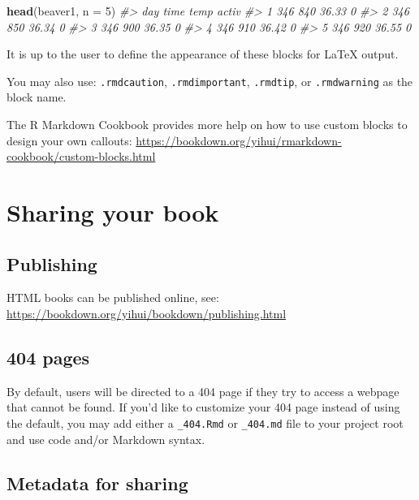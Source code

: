 \documentclass[
]{book}
\newenvironment{Shaded}{\begin{snugshade}}{\end{snugshade}}
\newcommand{\AttributeTok}[1]{\textcolor[rgb]{0.13,0.29,0.53}{#1}}
\newcommand{\CommentTok}[1]{\textcolor[rgb]{0.56,0.35,0.01}{\textit{#1}}}
\newcommand{\DecValTok}[1]{\textcolor[rgb]{0.00,0.00,0.81}{#1}}
\newcommand{\FunctionTok}[1]{\textcolor[rgb]{0.13,0.29,0.53}{\textbf{#1}}}
\newcommand{\NormalTok}[1]{#1}
\theoremstyle{definition}
\theoremstyle{definition}
\theoremstyle{definition}
\theoremstyle{definition}
\theoremstyle{remark}
\begin{document}
\begin{Shaded}
\begin{Highlighting}[]
\FunctionTok{head}\NormalTok{(beaver1, }\AttributeTok{n =} \DecValTok{5}\NormalTok{)}
\CommentTok{\#\textgreater{}   day time  temp activ}
\CommentTok{\#\textgreater{} 1 346  840 36.33     0}
\CommentTok{\#\textgreater{} 2 346  850 36.34     0}
\CommentTok{\#\textgreater{} 3 346  900 36.35     0}
\CommentTok{\#\textgreater{} 4 346  910 36.42     0}
\CommentTok{\#\textgreater{} 5 346  920 36.55     0}
\end{Highlighting}
\end{Shaded}

It is up to the user to define the appearance of these blocks for LaTeX output.

You may also use: \texttt{.rmdcaution}, \texttt{.rmdimportant}, \texttt{.rmdtip}, or \texttt{.rmdwarning} as the block name.

The R Markdown Cookbook provides more help on how to use custom blocks to design your own callouts: \url{https://bookdown.org/yihui/rmarkdown-cookbook/custom-blocks.html}

\hypertarget{sharing-your-book}{%
\chapter{Sharing your book}\label{sharing-your-book}}

\hypertarget{publishing}{%
\section{Publishing}\label{publishing}}

HTML books can be published online, see: \url{https://bookdown.org/yihui/bookdown/publishing.html}

\hypertarget{pages}{%
\section{404 pages}\label{pages}}

By default, users will be directed to a 404 page if they try to access a webpage that cannot be found. If you'd like to customize your 404 page instead of using the default, you may add either a \texttt{\_404.Rmd} or \texttt{\_404.md} file to your project root and use code and/or Markdown syntax.

\hypertarget{metadata-for-sharing}{%
\section{Metadata for sharing}\label{metadata-for-sharing}}
\end{document}
